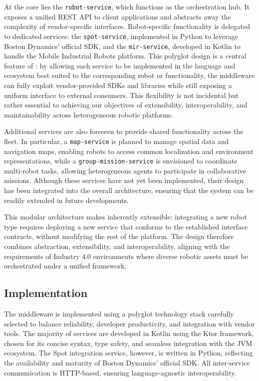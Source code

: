 \documentclass[conference]{IEEEtran}
\begin{document}
At the core lies the \texttt{robot-service}, 
 which functions as the orchestration hub. 
% 
It exposes a unified REST API to client applications 
 and abstracts away the complexity of vendor-specific interfaces. 
% 
Robot-specific functionality is delegated to dedicated services: 
 the \texttt{spot-service}, implemented in Python to leverage Boston Dynamics' official SDK, 
 and the \texttt{mir-service}, developed in Kotlin to handle the Mobile Industrial Robots platform. 
% 
This polyglot design is a central feature of \approach{}: 
 by allowing each service to be implemented in the language 
 and ecosystem best suited to the corresponding robot or functionality,
  the middleware can fully exploit vendor-provided SDKs and libraries 
  while still exposing a uniform interface to external consumers. 
%  
This flexibility is not incidental but rather essential to achieving our objectives of 
 extensibility, interoperability, and maintainability across heterogeneous robotic platforms.

Additional services are also foreseen to provide shared functionality across the fleet. 
%
In particular, a \texttt{map-service} is planned to manage spatial data and navigation maps, 
 enabling robots to access common localization and environment representations, 
 while a \texttt{group-mission-service} is envisioned to coordinate multi-robot tasks, 
 allowing heterogeneous agents to participate in collaborative missions. 
% 
Although these services have not yet been implemented, 
 their design has been integrated into the overall architecture, 
 ensuring that the system can be readily extended in future developments.

This modular architecture makes \approach{} inherently extensible: 
 integrating a new robot type requires deploying a new service that conforms to the established interface contracts, 
 without modifying the rest of the platform. 
% 
The design therefore combines abstraction, extensibility, and interoperability, 
 aligning with the requirements of Industry 4.0 environments where diverse robotic assets 
 must be orchestrated under a unified framework.

\subsection{Implementation}
The middleware is implemented using a polyglot technology stack carefully selected to 
 balance reliability, developer productivity, and integration with vendor tools. 
% 
The majority of services are developed in Kotlin using the Ktor framework, 
 chosen for its concise syntax, type safety, and seamless integration with the JVM ecosystem. 
% 
The Spot integration service, however, is written in Python, reflecting the availability 
 and maturity of Boston Dynamics' official SDK. 
% 
All inter-service communication is HTTP-based, ensuring language-agnostic interoperability.
\end{document}
